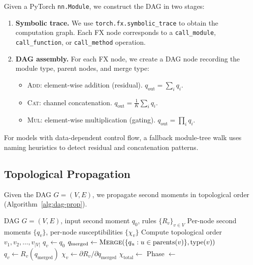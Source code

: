 \documentclass[10pt]{article}
\begin{document}
Given a PyTorch \texttt{nn.Module}, we construct the DAG in two stages:

\begin{enumerate}[nosep]
    \item \textbf{Symbolic trace.} We use \texttt{torch.fx.symbolic\_trace} to obtain the computation graph. Each FX node corresponds to a \texttt{call\_module}, \texttt{call\_function}, or \texttt{call\_method} operation.
    \item \textbf{DAG assembly.} For each FX node, we create a DAG node recording the module type, parent nodes, and merge type:
    \begin{itemize}[nosep]
        \item \textsc{Add}: element-wise addition (residual).  $q_{\mathrm{out}} = \sum_i q_i$.
        \item \textsc{Cat}: channel concatenation.  $q_{\mathrm{out}} = \frac{1}{K}\sum_i q_i$.
        \item \textsc{Mul}: element-wise multiplication (gating).  $q_{\mathrm{out}} = \prod_i q_i$.
    \end{itemize}
\end{enumerate}

For models with data-dependent control flow, a fallback module-tree walk uses naming heuristics to detect residual and concatenation patterns.

\subsection{Topological Propagation}
\label{subsec:topo-prop}

Given the DAG $G = (V, E)$, we propagate second moments in topological order (Algorithm~\ref{alg:dag-prop}).

\begin{algorithm}[t]
\caption{DAG Variance Propagation}
\label{alg:dag-prop}
\begin{algorithmic}[1]
\Require DAG $G = (V,E)$, input second moment $q_0$, rules $\{R_v\}_{v \in V}$
\Ensure Per-node second moments $\{q_v\}$, per-node susceptibilities $\{\chi_v\}$
\State Compute topological order $v_1, v_2, \ldots, v_{|V|}$
        \State $q_v \gets q_0$
    \Else
        \State $q_{\mathrm{merged}} \gets \textsc{Merge}(\{q_u : u \in \mathrm{parents}(v)\}, \mathrm{type}(v))$
        \State $q_v \gets R_v(q_{\mathrm{merged}})$
        \State $\chi_v \gets \partial R_v / \partial q_{\mathrm{merged}}$
    \EndIf
\EndFor
\State $\chi_{\mathrm{total}} \gets$ 
\State Phase $\gets$  
\end{algorithmic}
\end{algorithm}
\end{document}
